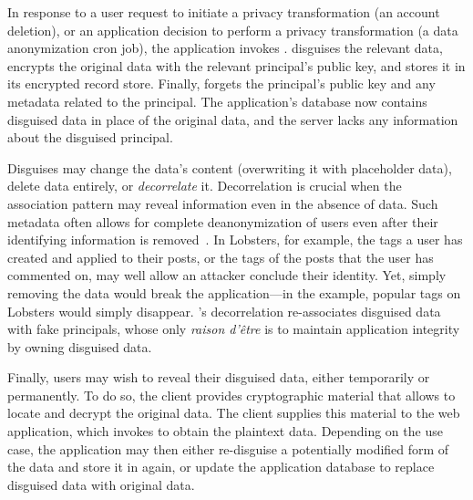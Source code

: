 %
In response to a user request to initiate a privacy transformation (\eg an account
deletion), or an application decision to perform a privacy transformation (\eg a
data anonymization cron job), the application invokes \sys.
%
\sys disguises the relevant data, encrypts the original data with the relevant
principal's public key, and stores it in its encrypted record store.
%
Finally, \sys forgets the principal's public key and any metadata related to the
principal.
%
The application's database now contains disguised data in place of the original
data, and the server lacks any information about the disguised principal.
%

%
Disguises may change the data's content (\eg overwriting it with placeholder data),
delete data entirely, or \emph{decorrelate} it.
%
Decorrelation is crucial when the association pattern may reveal information
even in the absence of data.
%
Such metadata often allows for complete deanonymization of users even after their
identifying information is removed~\cite{xxx}.
%
In Lobsters, for example, the tags a user has created and applied to their posts,
or the tags of the posts that the user has commented on, may well allow an attacker
conclude their identity.
%
Yet, simply removing the data would break the application---in the example,
popular tags on Lobsters would simply disappear.
%
\sys's decorrelation re-associates disguised data with fake principals, whose
only \emph{raison d'être} is to maintain application integrity by owning disguised
data.
%

%
Finally, users may wish to reveal their disguised data, either temporarily or
permanently.
%
To do so, the client provides cryptographic material that allows \sys to locate
and decrypt the original data.
%
The client supplies this material to the web application, which invokes \sys
to obtain the plaintext data.
%
Depending on the use case, the application may then either re-disguise a
potentially modified form of the data and store it in \sys again, or update the
application database to replace disguised data with original data.
%
